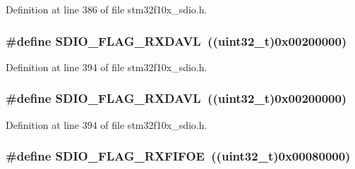 Definition at line 386 of file stm32f10x\+\_\+sdio.\+h.

\subsubsection[{\texorpdfstring{S\+D\+I\+O\+\_\+\+F\+L\+A\+G\+\_\+\+R\+X\+D\+A\+VL}{SDIO_FLAG_RXDAVL}}]{\setlength{\rightskip}{0pt plus 5cm}\#define S\+D\+I\+O\+\_\+\+F\+L\+A\+G\+\_\+\+R\+X\+D\+A\+VL~(({\bf uint32\+\_\+t})0x00200000)}\hypertarget{group___s_d_i_o___flags_ga7558b354658171bb6aa1b6f1e16d8e21}{}\label{group___s_d_i_o___flags_ga7558b354658171bb6aa1b6f1e16d8e21}


Definition at line 394 of file stm32f10x\+\_\+sdio.\+h.

\subsubsection[{\texorpdfstring{S\+D\+I\+O\+\_\+\+F\+L\+A\+G\+\_\+\+R\+X\+D\+A\+VL}{SDIO_FLAG_RXDAVL}}]{\setlength{\rightskip}{0pt plus 5cm}\#define S\+D\+I\+O\+\_\+\+F\+L\+A\+G\+\_\+\+R\+X\+D\+A\+VL~(({\bf uint32\+\_\+t})0x00200000)}\hypertarget{group___s_d_i_o___flags_ga7558b354658171bb6aa1b6f1e16d8e21}{}\label{group___s_d_i_o___flags_ga7558b354658171bb6aa1b6f1e16d8e21}


Definition at line 394 of file stm32f10x\+\_\+sdio.\+h.

\subsubsection[{\texorpdfstring{S\+D\+I\+O\+\_\+\+F\+L\+A\+G\+\_\+\+R\+X\+F\+I\+F\+OE}{SDIO_FLAG_RXFIFOE}}]{\setlength{\rightskip}{0pt plus 5cm}\#define S\+D\+I\+O\+\_\+\+F\+L\+A\+G\+\_\+\+R\+X\+F\+I\+F\+OE~(({\bf uint32\+\_\+t})0x00080000)}\hypertarget{group___s_d_i_o___flags_ga59ea7e2dc22df742053c5e525b98599d}{}\label{group___s_d_i_o___flags_ga59ea7e2dc22df742053c5e525b98599d}


